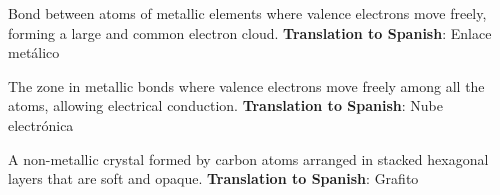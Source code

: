 \begin{vocabulary}
    Bond between atoms of metallic elements where valence electrons move freely, forming a large and common electron cloud. \newline
    \textbf{Translation to Spanish}: Enlace metálico \newline
\end{vocabulary}

\begin{vocabulary}
    The zone in metallic bonds where valence electrons move freely among all the atoms, allowing electrical conduction. \newline
    \textbf{Translation to Spanish}: Nube electrónica \newline
\end{vocabulary}

\begin{vocabulary}[Graphite]
    A non-metallic crystal formed by carbon atoms arranged in stacked hexagonal layers that are soft and opaque. \newline
    \textbf{Translation to Spanish}: Grafito \newline
\end{vocabulary}
    

